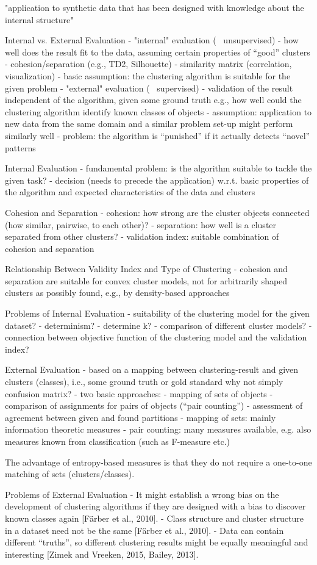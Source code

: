 "application to synthetic data that has been designed with knowledge about the internal structure" \cite{zimek-2024}

Internal vs. External Evaluation
- "internal" evaluation (~ unsupervised)
- how well does the result fit to the data, assuming certain properties of “good” clusters
- cohesion/separation (e.g., TD2, Silhouette)
- similarity matrix (correlation, visualization)
- basic assumption: the clustering algorithm is suitable for the given problem
- "external" evaluation (~ supervised)
- validation of the result independent of the algorithm, given some ground truth e.g., how well could the clustering algorithm identify known classes of objects
- assumption: application to new data from the same domain and a similar problem set-up might perform similarly well
- problem: the algorithm is “punished” if it actually detects “novel” patterns

Internal Evaluation
- fundamental problem: is the algorithm suitable to tackle the given task?
- decision (needs to precede the application) w.r.t. basic properties of the algorithm and expected characteristics of the data and clusters

Cohesion and Separation
- cohesion: how strong are the cluster objects connected (how similar, pairwise, to each other)?
- separation: how well is a cluster separated from other clusters?
- validation index: suitable combination of cohesion and separation

Relationship Between Validity Index and Type of Clustering
- cohesion and separation are suitable for convex cluster models, not for arbitrarily shaped clusters as possibly found, e.g., by density-based approaches

Problems of Internal Evaluation
- suitability of the clustering model for the given dataset?
- determinism?
- determine k?
- comparison of different cluster models?
- connection between objective function of the clustering model and the validation index?

External Evaluation
- based on a mapping between clustering-result and given clusters (classes), i.e., some ground truth or gold standard why not simply confusion matrix?
- two basic approaches:
- mapping of sets of objects
- comparison of assignments for pairs of objects (“pair counting”)
- assessment of agreement between given and found partitions
- mapping of sets: mainly information theoretic measures
- pair counting: many measures available, e.g. also measures known from classification (such as F-measure etc.)

The advantage of entropy-based measures is that they do not require a one-to-one matching of sets (clusters/classes).

Problems of External Evaluation
- It might establish a wrong bias on the development of  clustering algorithms if they are designed with a bias to discover known classes again [Färber et al., 2010].
- Class structure and cluster structure in a dataset need not be the same [Färber et al., 2010].
- Data can contain different “truths”, so different clustering results might be equally meaningful and interesting [Zimek and Vreeken, 2015, Bailey, 2013].